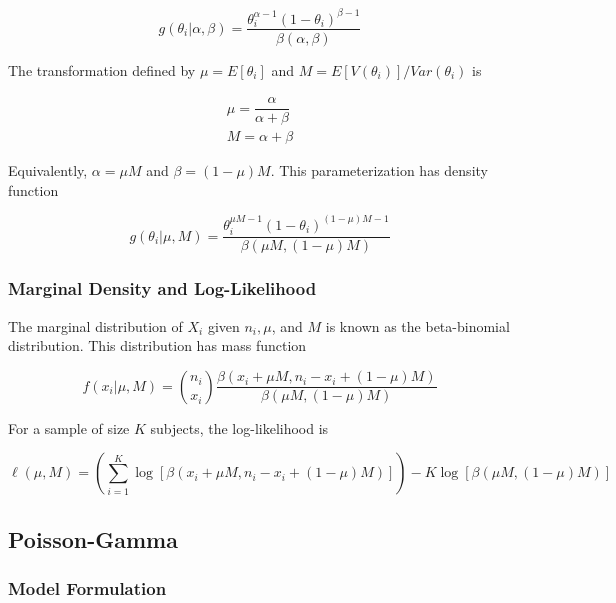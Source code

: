 \documentclass[12pt,epsfig]{article}
\begin{document}
\begin{equation*}
    g(\theta_i | \alpha, \beta) = \dfrac{\theta_i^{\alpha -1} (1 - \theta_i)^{\beta - 1}}{\beta(\alpha, \beta)}
\end{equation*}

The transformation defined by $\mu = E[\theta_i]$ and $M = E[V(\theta_i)]/Var(\theta_i)$ is

\begin{align*}
    \mu = \dfrac{\alpha}{\alpha + \beta}\\
    M = \alpha + \beta
\end{align*}

Equivalently, $\alpha = \mu M$ and $\beta = (1 - \mu) M$. This parameterization has density function

\begin{equation*}
    g(\theta_i | \mu, M) = \dfrac{\theta_i^{\mu M -1} (1 - \theta_i)^{(1-\mu)M - 1}}{\beta(\mu M, (1 - \mu)M)}
\end{equation*}


\subsubsection{Marginal Density and Log-Likelihood}

The marginal distribution of $X_i$ given $n_i, \mu$, and $M$ is known as the beta-binomial distribution. This distribution has mass function


\begin{equation*}
    f(x_i | \mu, M) =  {n_i \choose x_i} \dfrac{\beta(x_i + \mu M, n_i - x_i + (1 - \mu)M)}{\beta(\mu M, (1 - \mu)M)}
\end{equation*}

For a sample of size $K$ subjects, the log-likelihood is


\begin{equation*}
    \ell(\mu, M) = \left(\displaystyle \sum_{i = 1}^K \log[\beta(x_i + \mu M, n_i - x_i + (1 - \mu)M)]\right) - K\log[\beta(\mu M, (1 - \mu)M)]
\end{equation*}


\subsection{Poisson-Gamma}

\subsubsection{Model Formulation}
\end{document}
